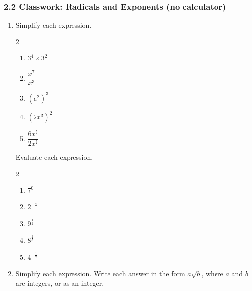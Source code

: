 \documentclass[12pt, twoside]{article}
\begin{document}
\subsubsection*{2.2 Classwork: Radicals and Exponents (no calculator)}

\begin{enumerate}[itemsep=0.15cm]

\item[1.]
Simplify each expression.

\begin{multicols}{2}\raggedcolumns
\begin{enumerate}[itemsep=0.25cm]
  \item $3^{4} \times 3^{2}$
  \item $\dfrac{x^{7}}{x^{3}}$
  \item $\left(a^{2}\right)^{3}$
  \columnbreak
  \item $\left(2x^{3}\right)^{2}$
  \item $\dfrac{6x^{5}}{2x^{2}}$
\end{enumerate}
\end{multicols}

Evaluate each expression.

\begin{multicols}{2}\raggedcolumns
\begin{enumerate}[itemsep=0.25cm]
  \item[(f)] $7^{0}$
  \item[(g)] $2^{-3}$
  \item[(h)] $9^{\frac{1}{2}}$
  \columnbreak
  \item[(i)] $8^{\frac{2}{3}}$
  \item[(j)] $4^{-\frac{1}{2}}$
\end{enumerate}
\end{multicols}


\newpage

\item[2.]
Simplify each expression. Write each answer in the form $a\sqrt{b}$,
where $a$ and $b$ are integers, or as an integer.


\end{enumerate}
\end{document}
